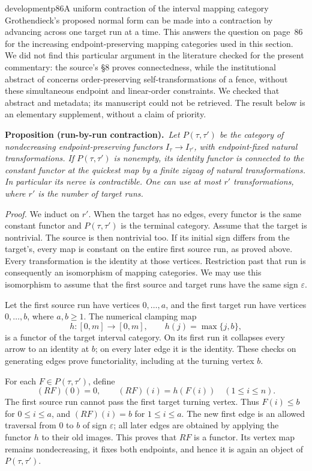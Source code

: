 \begin{dcomment}{development}{p86}{A uniform contraction of the interval mapping category}
Grothendieck's proposed normal form can be made into a contraction by advancing across one target run at a time. This answers the question on page~86 for the increasing endpoint-preserving mapping categories used in this section. We did not find this particular argument in the literature checked for the present commentary: the source's \S8 proves connectedness, while the institutional abstract of \citet{FernandesKoppitzMusunthia2019} concerns order-preserving self-transformations of a fence, without these simultaneous endpoint and linear-order constraints. We checked that abstract and metadata; its manuscript could not be retrieved. The result below is an elementary supplement, without a claim of priority.

\textbf{Proposition (run-by-run contraction).}\ours\
\textit{Let $P(\tau,\tau')$ be the category of nondecreasing endpoint-preserving functors $I_\tau\to I_{\tau'}$, with endpoint-fixed natural transformations. If $P(\tau,\tau')$ is nonempty, its identity functor is connected to the constant functor at the quickest map by a finite zigzag of natural transformations. In particular its nerve is contractible. One can use at most $r'$ transformations, where $r'$ is the number of target runs.}

\textit{Proof.} We induct on $r'$. When the target has no edges, every functor is the same constant functor and $P(\tau,\tau')$ is the terminal category. Assume that the target is nontrivial. The source is then nontrivial too. If its initial sign differs from the target's, every map is constant on the entire first source run, as proved above. Every transformation is the identity at those vertices. Restriction past that run is consequently an isomorphism of mapping categories. We may use this isomorphism to assume that the first source and target runs have the same sign $\varepsilon$.

Let the first source run have vertices $0,\ldots,a$, and the first target run have vertices $0,\ldots,b$, where $a,b\geq1$. The numerical clamping map
\[
 h:[0,m]\longrightarrow[0,m],\qquad h(j)=\max\{j,b\},
\]
is a functor of the target interval category. On its first run it collapses every arrow to an identity at $b$; on every later edge it is the identity. These checks on generating edges prove functoriality, including at the turning vertex $b$.

For each $F\in P(\tau,\tau')$, define
\[
 (RF)(0)=0,\qquad (RF)(i)=h(F(i))\quad(1\leq i\leq n).
\]
The first source run cannot pass the first target turning vertex. Thus $F(i)\leq b$ for $0\leq i\leq a$, and $(RF)(i)=b$ for $1\leq i\leq a$. The new first edge is an allowed traversal from $0$ to $b$ of sign $\varepsilon$; all later edges are obtained by applying the functor $h$ to their old images. This proves that $RF$ is a functor. Its vertex map remains nondecreasing, it fixes both endpoints, and hence it is again an object of $P(\tau,\tau')$.


\end{dcomment}
